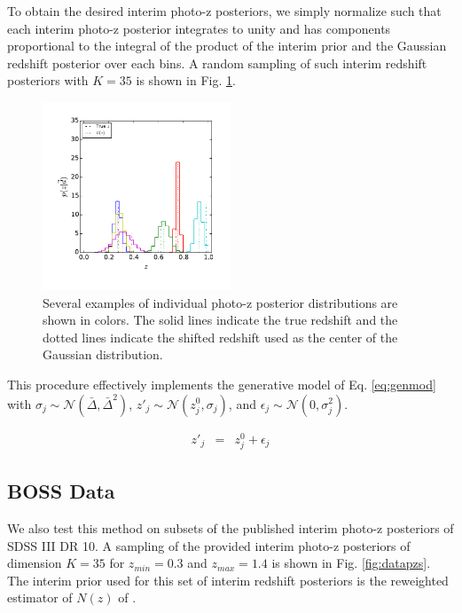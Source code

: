 \documentclass[preprint]{aastex}
\begin{document}
To obtain the desired interim photo-z posteriors, we simply normalize such that 
each interim photo-z posterior integrates to unity and has components 
proportional to the integral of the product of the interim prior and the 
Gaussian redshift posterior over each bins.  A random sampling of such interim 
redshift posteriors with $K=35$ is shown in Fig. \ref{fig:nullpzs}.

\begin{figure}
\includegraphics[width=0.5\textwidth]{figs/null/samplepzs.pdf}
\caption{Several examples of individual photo-z posterior distributions are 
shown in colors.  The solid lines indicate the true redshift and the dotted 
lines indicate the shifted redshift used as the center of the Gaussian 
distribution.}
\label{fig:nullpzs}
\end{figure}

This procedure effectively implements the generative model of Eq. 
\ref{eq:genmod} with 
$\sigma_{j}\sim\mathcal{N}(\bar{\Delta},\bar{\Delta}^{2})$, 
$z'_{j}\sim\mathcal{N}(z^{0}_{j},\sigma_{j})$, and 
$\epsilon_{j}\sim\mathcal{N}(0,\sigma^{2}_{j})$.

\begin{eqnarray}
\label{eq:genmod}
z'_{j} &=& z^{0}_{j}+\epsilon_{j}
\end{eqnarray}

\subsection{BOSS Data}
\label{sec:data}

We also test this method on subsets of the published interim photo-z posteriors 
of SDSS III DR 10.  A sampling of the provided interim photo-z posteriors of 
dimension $K=35$ for $z_{min}=0.3$ and $z_{max}=1.4$ is shown in Fig. 
\ref{fig:datapzs}.  The interim prior used for this set of interim redshift 
posteriors is the reweighted estimator of $N(z)$ of \citet{Sheldon2012}.
\end{document}
